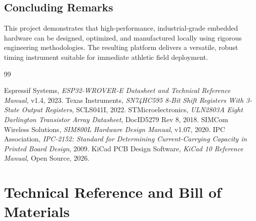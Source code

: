 \documentclass[12pt,a4paper,oneside]{report}
\begin{document}
\section*{Concluding Remarks}
This project demonstrates that high-performance, industrial-grade embedded hardware can be designed, optimized, and manufactured locally using rigorous engineering methodologies. The resulting platform delivers a versatile, robust timing instrument suitable for immediate athletic field deployment.

\newpage

\begin{thebibliography}{99}

 Espressif Systems, \emph{ESP32-WROVER-E Datasheet and Technical Reference Manual}, v1.4, 2023.
 Texas Instruments, \emph{SN74HC595 8-Bit Shift Registers With 3-State Output Registers}, SCLS041I, 2022.
 STMicroelectronics, \emph{ULN2803A Eight Darlington Transistor Array Datasheet}, DocID5279 Rev 8, 2018.
 SIMCom Wireless Solutions, \emph{SIM800L Hardware Design Manual}, v1.07, 2020.
 IPC Association, \emph{IPC-2152: Standard for Determining Current-Carrying Capacity in Printed Board Design}, 2009.
 KiCad PCB Design Software, \emph{KiCad 10 Reference Manual}, Open Source, 2026.

\end{thebibliography}

\appendix
\chapter{Technical Reference and Bill of Materials}
\end{document}
